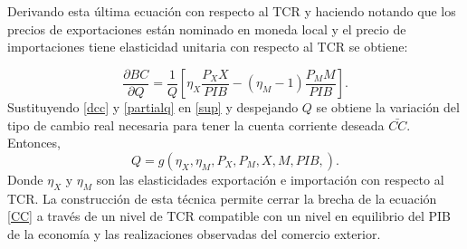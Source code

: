 \documentclass[12pt,letterpaper]{article}
\begin{document}
Derivando esta última ecuación con respecto al TCR y haciendo notando que los precios de exportaciones están nominado en moneda local y el precio de importaciones tiene elasticidad unitaria con respecto al TCR se obtiene:

\begin{equation}\label{partialq}
\frac{\partial BC}{\partial Q}=\frac{1}{Q} \left[\eta_X \frac{P_X X}{PIB}-(\eta_M -1)\frac{P_M M}{PIB}\right].
\end{equation}
Sustituyendo \ref{dcc} y \ref{partialq} en \ref{sup} y despejando $Q$ se obtiene la variación del tipo de cambio real necesaria para tener la cuenta corriente deseada $\bar{CC}$. Entonces,
\begin{equation}\label{qfeer}
Q=g\left(\eta_X,\eta_M,P_X,P_M,X,M,PIB,\right).
\end{equation}
Donde $\eta_X$ y $\eta_M$ son las elasticidades exportación e importación con respecto al TCR. La construcción de esta técnica permite cerrar la brecha de la ecuación \ref{CC} a través de un nivel de TCR compatible con un nivel en equilibrio del PIB de la economía y las realizaciones observadas del comercio exterior.


\end{document}
